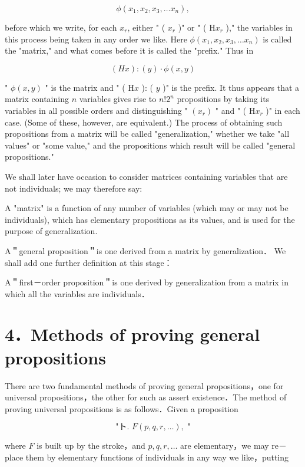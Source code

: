 \documentclass[10pt]{article}
\begin{document}
$$
\phi\left(x_{1}, x_{2}, x_{3}, \ldots x_{n}\right),
$$

before which we write, for each $x_{r}$, either " ( $x_{r}$ )" or " ( $\mathrm{H} x_{r}$ )," the variables in this process being taken in any order we like. Here $\phi\left(x_{1}, x_{2}, x_{3}, \ldots x_{n}\right)$ is called the "matrix," and what comes before it is called the "prefix." Thus in

$$
(H x):(y) \cdot \phi(x, y)
$$

" $\phi(x, y)$ " is the matrix and " ( $\mathrm{H} x$ ): ( $y$ )" is the prefix. It thus appears that a matrix containing $n$ variables gives rise to $n!2^{n}$ propositions by taking its variables in all possible orders and distinguishing " $\left(x_{r}\right)$ " and " ( $\mathrm{H} x_{r}$ )" in each case. (Some of these, however, are equivalent.) The process of obtaining such propositions from a matrix will be called "generalization," whether we take "all values" or "some value," and the propositions which result will be called "general propositions."

We shall later have occasion to consider matrices containing variables that are not individuals; we may therefore say:

A "matrix" is a function of any number of variables (which may or may not be individuals), which has elementary propositions as its values, and is used for the purpose of generalization.

A＂general proposition＂is one derived from a matrix by generalization． We shall add one further definition at this stage：

A＂first－order proposition＂is one derived by generalization from a matrix in which all the variables are individuals．

\section*{4．Methods of proving general propositions}
There are two fundamental methods of proving general propositions，one for universal propositions，the other for such as assert existence．The method of proving universal propositions is as follows．Given a proposition

$$
\text { "ト. } F(p, q, r, \ldots), \text { " }
$$

where $F$ is built up by the stroke，and $p, q, r, \ldots$ are elementary，we may re－ place them by elementary functions of individuals in any way we like，putting
\end{document}
